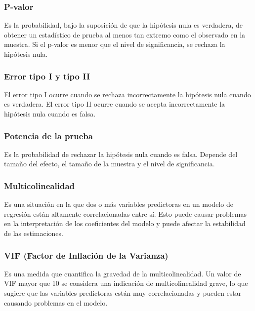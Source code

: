 \documentclass[
  11pt,
  bookmarksnumbered]{article}
\begin{document}
\hypertarget{p-valor}{%
\subsubsection{P-valor}\label{p-valor}}

Es la probabilidad, bajo la suposición de que la hipótesis nula es verdadera, de obtener un estadístico de prueba al menos tan extremo como el observado en la muestra.
Si el p-valor es menor que el nivel de significancia, se rechaza la hipótesis nula.

\hypertarget{error-tipo-i-y-tipo-ii}{%
\subsubsection{Error tipo I y tipo II}\label{error-tipo-i-y-tipo-ii}}

El error tipo I ocurre cuando se rechaza incorrectamente la hipótesis nula cuando es verdadera.
El error tipo II ocurre cuando se acepta incorrectamente la hipótesis nula cuando es falsa.

\hypertarget{potencia-de-la-prueba}{%
\subsubsection{Potencia de la prueba}\label{potencia-de-la-prueba}}

Es la probabilidad de rechazar la hipótesis nula cuando es falsa.
Depende del tamaño del efecto, el tamaño de la muestra y el nivel de significancia.

\hypertarget{multicolinealidad}{%
\subsubsection{Multicolinealidad}\label{multicolinealidad}}

Es una situación en la que dos o más variables predictoras en un modelo de regresión están altamente correlacionadas entre sí.
Esto puede causar problemas en la interpretación de los coeficientes del modelo y puede afectar la estabilidad de las estimaciones.

\hypertarget{vif-factor-de-inflaciuxf3n-de-la-varianza}{%
\subsubsection{VIF (Factor de Inflación de la Varianza)}\label{vif-factor-de-inflaciuxf3n-de-la-varianza}}

Es una medida que cuantifica la gravedad de la multicolinealidad.
Un valor de VIF mayor que 10 se considera una indicación de multicolinealidad grave, lo que sugiere que las variables predictoras están muy correlacionadas y pueden estar causando problemas en el modelo.
\end{document}
